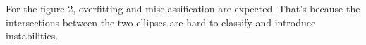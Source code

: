 \documentclass{article}
\begin{document}
For the figure 2, overfitting and misclassification are expected. That's because the intersections between the two
ellipses are hard to classify and introduce instabilities.




\begin{figure}[htbp]
  \centering
  
  

\end{figure}
\end{document}
